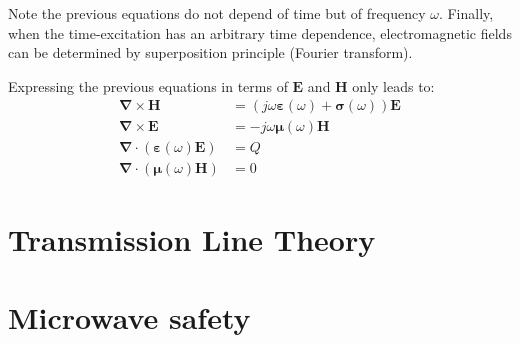 Note the previous equations do not depend of time but of frequency $\omega$. Finally, when the time-excitation has an arbitrary time dependence, electromagnetic fields can be determined by superposition principle (Fourier transform). 

Expressing the previous equations in terms of $\mathbf{E}$ and $\mathbf{H}$ only leads to:
\begin{subequations}
 \begin{align}
  \boldsymbol{\nabla} \times \mathbf{H} &= \left(j\omega\boldsymbol{\varepsilon}(\omega) + \boldsymbol{\sigma}(\omega) \right) \mathbf{E}  \label{eq:Maxwell-Faraday-Harmonic} \\
  \boldsymbol{\nabla} \times \mathbf{E} &= -j\omega\boldsymbol{\mu}(\omega) \mathbf{H}  \label{eq:Maxwell-Ampere-Harmonic} \\
  \boldsymbol{\nabla} \cdot (\boldsymbol{\varepsilon}(\omega) \mathbf{E}) &= Q \label{eq:Maxwell-Gauss-Harmonic} \\
  \boldsymbol{\nabla} \cdot (\boldsymbol{\mu}(\omega) \mathbf{H} ) &= 0 \label{eq:Maxwell-Gauss-Magnetism-Harmonic} 
 \end{align}

\end{subequations}


\section{Transmission Line Theory}

\section{Microwave safety}
\parencite[sec.5.8.3]{Benford2015}


